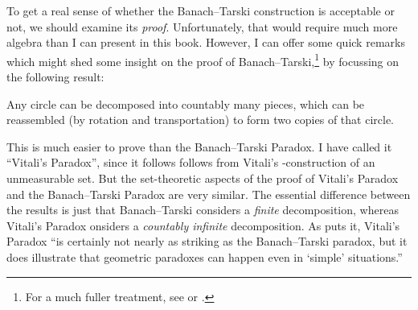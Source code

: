 \documentclass[../../../include/open-logic-section]{subfiles}
\begin{document}
\newcommand{\onesphere}{\mathbf{S}}
To get a real sense of whether the Banach--Tarski construction is acceptable or not, we should examine its \emph{proof}. Unfortunately, that would require much more algebra than I can present in this book. However, I can offer some quick remarks which might shed some insight on the proof of Banach--Tarski,\footnote{For a much fuller treatment, see \cite{WestonUnpublished} or \cite{Wagon2016}.} by focussing on the following result:
\begin{thm}
	Any circle can be decomposed into countably many pieces, which can be reassembled (by rotation and transportation) to form two copies of that circle.
\end{thm}\noindent
This is much easier to prove than the Banach--Tarski Paradox. I have called it ``Vitali's Paradox'', since it follows follows from Vitali's \citeyear{Vitali1905}-construction of an unmeasurable set.  But the set-theoretic aspects of the proof of Vitali's Paradox and the Banach--Tarski Paradox are very similar. The essential difference between the results is just that Banach--Tarski considers a \emph{finite} decomposition, whereas Vitali's Paradox onsiders a \emph{countably infinite} decomposition.  As \citet[]{WestonUnpublished} puts it, Vitali's Paradox ``is certainly not nearly as striking as the Banach--Tarski paradox, but it does illustrate that geometric paradoxes can  happen even in `simple' situations.'' 
\end{document}
